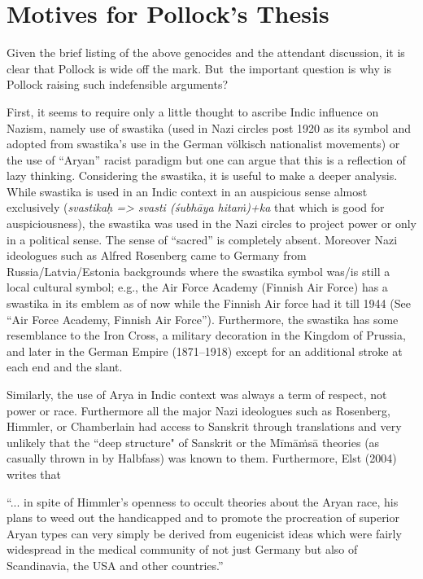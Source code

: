\section*{Motives for Pollock’s Thesis}
Given the brief listing of the above genocides and the attendant discussion, it is clear that Pollock is wide off the mark. But~the important question is why is Pollock raising such indefensible arguments?

First, it seems to require only a little thought to ascribe Indic influence on Nazism, namely use of swastika (used in Nazi circles post 1920 as its symbol and adopted from swastika's use in the German völkisch nationalist movements) or the use of “Aryan” racist paradigm but one can argue that this is a reflection of lazy thinking. Considering the swastika, it is useful to make a deeper analysis. While swastika is used in an Indic context in an auspicious sense almost exclusively ({\sl svastikaḥ => svasti (śubhāya hitaṁ)+ka} that which is good for auspiciousness), the swastika was used in the Nazi circles to project power or only in a political sense. The sense of “sacred” is completely absent. Moreover Nazi ideologues such as Alfred Rosenberg came to Germany from Russia/Latvia/Estonia backgrounds where the swastika symbol was/is still a local cultural symbol; e.g., the Air Force Academy (Finnish Air Force) has a swastika in its emblem as of now while the Finnish Air force had it till 1944 (See “Air Force Academy, Finnish Air Force”). Furthermore, the swastika has some resemblance to the Iron Cross, a military decoration in the Kingdom of Prussia, and later in the German Empire (1871–1918) except for an additional stroke at each end and the slant.

Similarly, the use of Arya in Indic context was always a term of respect, not power or race. Furthermore all the major Nazi ideologues such as Rosenberg, Himmler, or Chamberlain had access to Sanskrit through translations and very unlikely that the ``deep structure" of Sanskrit or the Mīmāṁsā theories (as casually thrown in by Halbfass) was known to them. Furthermore, Elst (2004) writes that 

\begin{myquote}
“... in spite of Himmler's openness to occult theories about the Aryan race, his plans to weed out the handicapped and to promote the procreation of superior Aryan types can very simply be derived from eugenicist ideas which were fairly widespread in the medical community of not just Germany but also of Scandinavia, the USA and other countries.”
\end{myquote}

